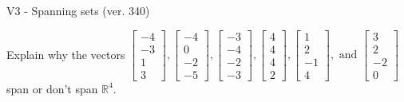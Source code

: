 \begin{exercise}
  \begin{exerciseTitle}V3 - Spanning sets (ver. 340)\end{exerciseTitle}
  \begin{exerciseStatement}
    Explain why the vectors \(\left[\begin{array}{r}
-4 \\
-3 \\
1 \\
3
\end{array}\right] , \left[\begin{array}{r}
-4 \\
0 \\
-2 \\
-5
\end{array}\right] , \left[\begin{array}{r}
-3 \\
-4 \\
-2 \\
-3
\end{array}\right] , \left[\begin{array}{r}
4 \\
4 \\
4 \\
2
\end{array}\right] , \left[\begin{array}{r}
1 \\
2 \\
-1 \\
4
\end{array}\right] , \text{ and } \left[\begin{array}{r}
3 \\
2 \\
-2 \\
0
\end{array}\right]\) span or don't span \(\mathbb{R}^4\). 
	



\end{exerciseStatement}
\end{exercise}
